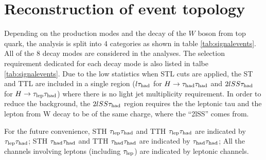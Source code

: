 


\section{Reconstruction of event topology}
\label{sec:reconstruction}

Depending on the production modes and the decay of the $W$ boson from top quark, the analysis is split into 4 categories as shown in table \ref{tab:signalevents}. All of the 8 decay modes are considered in the analyses. The selection requirement dedicated for each decay mode is also listed in talbe \ref{tab:signalevents}. Due to the low statistics when STL cuts are applied, the ST and TTL are included in a single region ($l\tau_\text{had}$ for $H\to\tau_\text{had}{}\tau_\text{had}$ and $2lSS\tau_\text{had}$ for $H\to\tau_\text{lep}{}\tau_\text{had}$) where there is no light jet multiplicity requirement. In order to reduce the background, the $2lSS\tau_\text{had}$ region requires the the leptonic tau and the lepton from W decay to be of the same charge, where the ``2lSS'' comes from.

For the future convenience, STH $\tau_\text{lep}{}\tau_\text{had}$ and TTH $\tau_\text{lep}{}\tau_\text{had}$ are indicated by $\tau_\text{lep}{}\tau_\text{had}$; STH $\tau_\text{had}{}\tau_\text{had}$ and TTH $\tau_\text{had}{}\tau_\text{had}$ are indicated by $\tau_\text{had}{}\tau_\text{had}$; All the channels involving leptons (including $\tau_\text{lep}$) are indicated by leptonic channels.

